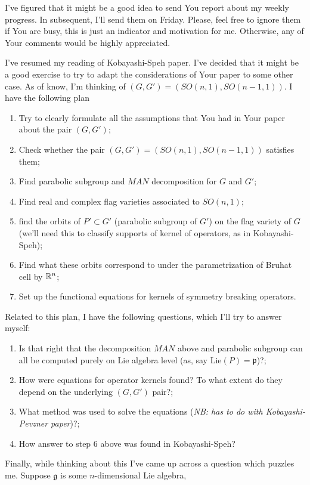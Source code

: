 \documentclass[12pt]{article} %
\begin{document}
I've figured that it might be a good idea to send You report about my weekly progress. In subsequent, I'll send them on Friday.
 Please, feel free to ignore them if You are busy, this is just an indicator and motivation for me. Otherwise, any of Your comments would be 
highly appreciated.

I've resumed my reading of Kobayashi-Speh paper. I've decided that it might be a good exercise to try to adapt the considerations of Your paper
to some other case. As of know, I'm thinking of $(G,G')=(SO(n,1),SO(n-1,1))$. I have the following plan 
\begin{enumerate}
\item Try to clearly formulate all the assumptions that You had in Your paper about the pair $(G,G')$;
\item Check whether the pair $(G,G')=(SO(n,1),SO(n-1,1))$ satisfies them;
\item Find parabolic subgroup and $MAN$ decomposition for $G$ and $G'$;
\item Find real and complex flag varieties associated to $SO(n,1)$;
\item find the orbits of $P'\subset G'$ (parabolic subgroup of $G'$) on the flag variety of $G$ (we'll need this to classify
supports of kernel of operators, as in Kobayashi-Speh);
\item Find what these orbits correspond to under the parametrization of Bruhat cell by $\mathbb{R}^n$;
\item Set up the functional equations for kernels of symmetry breaking operators.
\end{enumerate}
Related to this plan, I have the following questions, which I'll try to answer myself:
\begin{enumerate}
\item Is that right that the decomposition $MAN$ above and parabolic subgroup can all be computed purely on Lie algebra level (as, say
 $\mbox{Lie}(P)=\mathfrak{p}$)?;
\item How were equations for operator kernels found? To what extent do they depend on the underlying $(G,G')$ pair?;
\item What method was used to solve the equations (\textit{NB: has to do with Kobayashi-Pevzner paper})?;
\item How answer to step 6 above was found in Kobayashi-Speh?
\end{enumerate}
Finally, while thinking about this I've came up across a question which puzzles me. Suppose $\mathfrak{g}$ is some $n$-dimensional Lie algebra,
\end{document}
